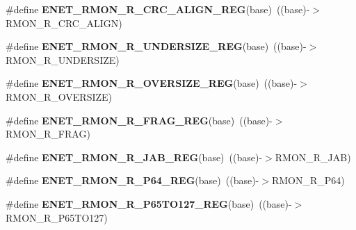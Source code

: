 \begin{DoxyCompactItemize}
\item 
\#define {\bfseries E\+N\+E\+T\+\_\+\+R\+M\+O\+N\+\_\+\+R\+\_\+\+C\+R\+C\+\_\+\+A\+L\+I\+G\+N\+\_\+\+R\+EG}(base)~((base)-\/$>$R\+M\+O\+N\+\_\+\+R\+\_\+\+C\+R\+C\+\_\+\+A\+L\+I\+GN)\hypertarget{group__ENET__Register__Accessor__Macros_ga70617df03d4a601b240cabb121635277}{}\label{group__ENET__Register__Accessor__Macros_ga70617df03d4a601b240cabb121635277}

\item 
\#define {\bfseries E\+N\+E\+T\+\_\+\+R\+M\+O\+N\+\_\+\+R\+\_\+\+U\+N\+D\+E\+R\+S\+I\+Z\+E\+\_\+\+R\+EG}(base)~((base)-\/$>$R\+M\+O\+N\+\_\+\+R\+\_\+\+U\+N\+D\+E\+R\+S\+I\+ZE)\hypertarget{group__ENET__Register__Accessor__Macros_ga5669edb0410f746459112f2cb57b1a7e}{}\label{group__ENET__Register__Accessor__Macros_ga5669edb0410f746459112f2cb57b1a7e}

\item 
\#define {\bfseries E\+N\+E\+T\+\_\+\+R\+M\+O\+N\+\_\+\+R\+\_\+\+O\+V\+E\+R\+S\+I\+Z\+E\+\_\+\+R\+EG}(base)~((base)-\/$>$R\+M\+O\+N\+\_\+\+R\+\_\+\+O\+V\+E\+R\+S\+I\+ZE)\hypertarget{group__ENET__Register__Accessor__Macros_gaa04a1630a859a56bc632bfab873cbf37}{}\label{group__ENET__Register__Accessor__Macros_gaa04a1630a859a56bc632bfab873cbf37}

\item 
\#define {\bfseries E\+N\+E\+T\+\_\+\+R\+M\+O\+N\+\_\+\+R\+\_\+\+F\+R\+A\+G\+\_\+\+R\+EG}(base)~((base)-\/$>$R\+M\+O\+N\+\_\+\+R\+\_\+\+F\+R\+AG)\hypertarget{group__ENET__Register__Accessor__Macros_gab2e82b83e09c4b55699908a92d7d95e4}{}\label{group__ENET__Register__Accessor__Macros_gab2e82b83e09c4b55699908a92d7d95e4}

\item 
\#define {\bfseries E\+N\+E\+T\+\_\+\+R\+M\+O\+N\+\_\+\+R\+\_\+\+J\+A\+B\+\_\+\+R\+EG}(base)~((base)-\/$>$R\+M\+O\+N\+\_\+\+R\+\_\+\+J\+AB)\hypertarget{group__ENET__Register__Accessor__Macros_gabcec6f14a6fb78aac07bd6245aa705af}{}\label{group__ENET__Register__Accessor__Macros_gabcec6f14a6fb78aac07bd6245aa705af}

\item 
\#define {\bfseries E\+N\+E\+T\+\_\+\+R\+M\+O\+N\+\_\+\+R\+\_\+\+P64\+\_\+\+R\+EG}(base)~((base)-\/$>$R\+M\+O\+N\+\_\+\+R\+\_\+\+P64)\hypertarget{group__ENET__Register__Accessor__Macros_gae8862aa6875b7d79e922251e3300b1d4}{}\label{group__ENET__Register__Accessor__Macros_gae8862aa6875b7d79e922251e3300b1d4}

\item 
\#define {\bfseries E\+N\+E\+T\+\_\+\+R\+M\+O\+N\+\_\+\+R\+\_\+\+P65\+T\+O127\+\_\+\+R\+EG}(base)~((base)-\/$>$R\+M\+O\+N\+\_\+\+R\+\_\+\+P65\+T\+O127)\hypertarget{group__ENET__Register__Accessor__Macros_ga245c663daff3ae4e24c1565a472beef0}{}\label{group__ENET__Register__Accessor__Macros_ga245c663daff3ae4e24c1565a472beef0}


\end{DoxyCompactItemize}
